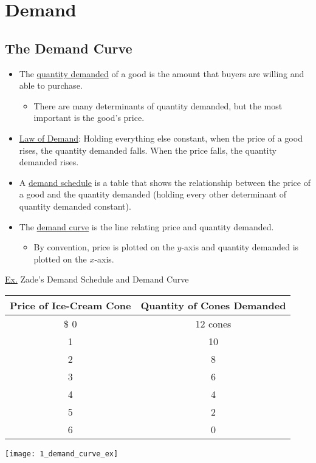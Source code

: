 \section{Demand}

\subsection{The Demand Curve}

	\begin{itemize}

	\item The \underline{quantity demanded} of a good is the amount that buyers are willing and able to purchase.
	
		\begin{itemize}
		
		\item There are many determinants of quantity demanded, but the most important is the good's price.
		
		\end{itemize}
		
	\item \underline{Law of Demand}: Holding everything else constant, when the price of a good rises, the quantity demanded falls. When the price falls, the quantity demanded rises.
	
	\item A \underline{demand schedule} is a table that shows the relationship between the price of a good and the quantity demanded (holding every other determinant of quantity demanded constant).
	
	\item The \underline{demand curve} is the line relating price and quantity demanded.
	
		\begin{itemize}
		
		\item By convention, price is plotted on the $y$-axis and quantity demanded is plotted on the $x$-axis.
		
		\end{itemize}

	\end{itemize}
	
	\underline{Ex.} Zade's Demand Schedule and Demand Curve
	
	\begin{center}
	\begin{tabular}{ c | c }
	Price of Ice-Cream Cone & Quantity of Cones Demanded \\
	\hline
	\$ 0 & 12 cones \\
	1 & 10 \\
	2 & 8 \\
	3 & 6 \\
	4 & 4 \\
	5 & 2 \\
	6 & 0
	\end{tabular}
	
	\vspace{5mm}
	
	\texttt{[image: 1\_demand\_curve\_ex]}
	\end{center}
	


